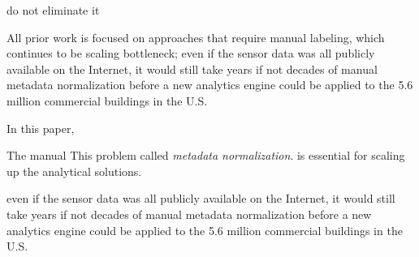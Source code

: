   do not eliminate it

All prior work is focused on approaches that require manual labeling, which 
continues to be scaling bottleneck;
even if the sensor data was all publicly available on the Internet, it would still take years if not decades of manual metadata normalization before a new analytics engine could be applied to the 5.6 million commercial buildings in the U.S.


In this paper, 


The manual This problem called {\em metadata
  normalization}.  is essential for scaling up the analytical solutions.


even if the sensor data was all publicly available on the Internet, it would still take years if not decades of manual metadata normalization before a new analytics engine could be applied to the 5.6 million commercial buildings in the U.S.

